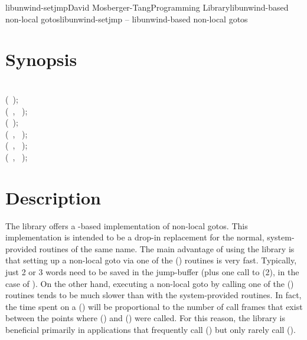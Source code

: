 \documentclass{article}
\begin{document}
\begin{Name}{3}{libunwind-setjmp}{David Mosberger-Tang}{Programming Library}{libunwind-based non-local gotos}libunwind-setjmp -- libunwind-based non-local gotos
\end{Name}

\section{Synopsis}

\\

\noindent
{} (~);\\
 (~, ~);\\
 (~);\\
 (~, ~);\\
 (~, ~);\\
 (~, ~);\\

\section{Description}

The  library offers a -based
implementation of non-local gotos.  This implementation is intended to
be a drop-in replacement for the normal, system-provided routines of
the same name.  The main advantage of using the 
library is that setting up a non-local goto via one of the
() routines is very fast.  Typically, just 2 or 3 words
need to be saved in the jump-buffer (plus one call to
(2), in the case of ).  On the
other hand, executing a non-local goto by calling one of the
() routines tends to be much slower than with the
system-provided routines.  In fact, the time spent on a
() will be proportional to the number of call frames
that exist between the points where () and
() were called.  For this reason, the
 library is beneficial primarily in applications
that frequently call () but only rarely call
().
\end{document}
